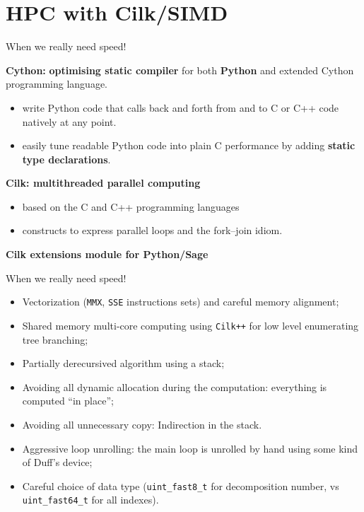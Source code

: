 \documentclass[compress,11pt]{beamer}
\begin{document}
\section{HPC with Cilk/SIMD}


\newcommand{\CilkP}{\texttt{Cilk++}\xspace}
\newcommand{\CPP}{\texttt{C++}\xspace}
\newcommand{\MMX}{\texttt{MMX}\xspace}
\newcommand{\SIMD}{\texttt{SIMD}\xspace}
\newcommand{\SSE}{\texttt{SSE}\xspace}
\newcommand{\SSEV}{\texttt{SSE4.1}\xspace}

\begin{frame}[fragile]{When we really need speed!}

  \textbf{Cython:} \textbf{optimising static compiler} for both
  \textbf{Python} and extended Cython programming language.

\begin{itemize}
\item write Python code that calls back and forth from and to C or C++ code
  natively at any point.
\item easily tune readable Python code into plain C performance by adding
  \textbf{static type declarations}.
\end{itemize}
\bigskip\pause

\textbf{Cilk: multithreaded parallel computing}
\begin{itemize}
\item based on the C and C++ programming languages
\item constructs to express parallel loops and the fork–join idiom.
\end{itemize}
\bigskip\pause

\centering \textbf{\Large\color{red}Cilk extensions module for Python/Sage}
\end{frame}

\begin{frame}[fragile]{When we really need speed!}
\begin{itemize}

\item Vectorization (\MMX, \SSE instructions sets) and careful memory alignment;
\item Shared memory multi-core computing using \CilkP for low level
  enumerating tree branching;
\item Partially derecursived algorithm using a stack;
\item Avoiding all dynamic allocation during the computation: everything is
  computed ``in place'';
\item Avoiding all unnecessary copy: Indirection in the stack.
\item Aggressive loop unrolling: the main loop is unrolled by hand using some
  kind of Duff's device;
\item Careful choice of data type (\verb|uint_fast8_t| for decomposition
  number, vs \verb|uint_fast64_t| for all indexes).
\end{itemize}  
\end{frame}
\end{document}
